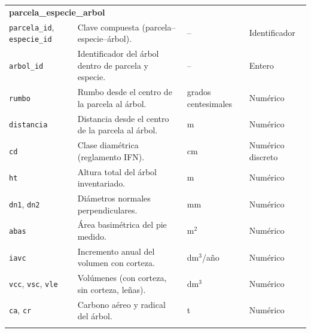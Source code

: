 \begin{longtable}{@{}p{2.8cm} p{6.8cm} p{2.2cm} p{2.2cm}@{}}
    \multicolumn{4}{l}{\textbf{parcela\_especie\_arbol}}                                                                                                                                           \\
    \texttt{parcela\_id}, \texttt{especie\_id}                             & Clave compuesta (parcela–especie–árbol).                       & --                           & Identificador         \\
    \texttt{arbol\_id}                                                     & Identificador del árbol dentro de parcela y especie.           & --                           & Entero                \\
    \texttt{rumbo}                                                         & Rumbo desde el centro de la parcela al árbol.                  & grados centesimales          & Numérico              \\
    \texttt{distancia}                                                     & Distancia desde el centro de la parcela al árbol.              & m                            & Numérico              \\
    \texttt{cd}                                                            & Clase diamétrica (reglamento IFN).                             & cm                           & Numérico discreto     \\
    \texttt{ht}                                                            & Altura total del árbol inventariado.                           & m                            & Numérico              \\
    \texttt{dn1}, \texttt{dn2}                                             & Diámetros normales perpendiculares.                            & mm                           & Numérico              \\
    \texttt{abas}                                                          & Área basimétrica del pie medido.                               & m$^{2}$                      & Numérico              \\
    \texttt{iavc}                                                          & Incremento anual del volumen con corteza.                      & dm$^{3}$/año                 & Numérico              \\
    \texttt{vcc}, \texttt{vsc}, \texttt{vle}                               & Volúmenes (con corteza, sin corteza, leñas).                   & dm$^{3}$                     & Numérico              \\
    \texttt{ca}, \texttt{cr}                                               & Carbono aéreo y radical del árbol.                             & t                            & Numérico              \\
    \addlinespace


\end{longtable}

